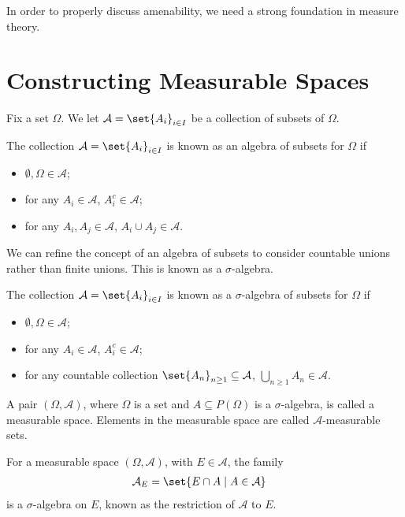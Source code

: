 In order to properly discuss amenability, we need a strong foundation in measure theory.

\section{Constructing Measurable Spaces}%
Fix a set $\Omega$. We let $\mathcal{A} =\set{A_{i}}_{i\in I}$ be a collection of subsets of $\Omega$.
\begin{definition}
  The collection $\mathcal{A} = \set{A_i}_{i\in I}$ is known as an algebra of subsets for $\Omega$ if
  \begin{itemize}
    \item $\emptyset,\Omega \in \mathcal{A}$;
    \item for any $A_i\in \mathcal{A}$, $A_i^{c}\in \mathcal{A}$;
    \item for any $A_i,A_j\in \mathcal{A}$, $A_i \cup A_j \in \mathcal{A}$.
  \end{itemize}
\end{definition}
We can refine the concept of an algebra of subsets to consider countable unions rather than finite unions. This is known as a $\sigma$-algebra.
\begin{definition}
  The collection $\mathcal{A} = \set{A_i}_{i\in I}$ is known as a $\sigma$-algebra of subsets for $\Omega$ if
  \begin{itemize}
    \item $\emptyset,\Omega \in \mathcal{A}$;
    \item for any $A_i\in \mathcal{A}$, $A_i^{c}\in \mathcal{A}$;
    \item for any countable collection $\set{A_n}_{n\geq 1}\subseteq \mathcal{A}$, $\bigcup_{n\geq 1}A_{n} \in \mathcal{A}$.
  \end{itemize}
\end{definition}
\begin{definition}
A pair $\left(\Omega,\mathcal{A}\right)$, where $\Omega$ is a set and $A\subseteq P(\Omega)$ is a $\sigma$-algebra, is called a measurable space. Elements in the measurable space are called $\mathcal{A}$-measurable sets.
\end{definition}
\begin{definition}
  For a measurable space $\left(\Omega,\mathcal{A}\right)$, with $E\in \mathcal{A}$, the family
  \begin{align*}
    \mathcal{A}_{E} &= \set{E\cap A\mid A\in \mathcal{A}}
  \end{align*}
  is a $\sigma$-algebra on $E$, known as the restriction of $\mathcal{A}$ to $E$.
\end{definition}
